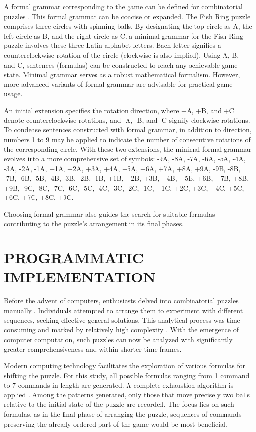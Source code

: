 \documentclass[a4paper,twocolumn,10pt]{article}
\begin{document}
A formal grammar corresponding to the game can be defined for combinatorial puzzles \cite{baral2011solving}. This formal grammar can be concise or expanded. The Fish Ring puzzle comprises three circles with spinning balls. By designating the top circle as A, the left circle as B, and the right circle as C, a minimal grammar \cite{lecomte1999towards} for the Fish Ring puzzle involves these three Latin alphabet letters. Each letter signifies a counterclockwise rotation of the circle (clockwise is also implied). Using A, B, and C, sentences (formulas) can be constructed to reach any achievable game state. Minimal grammar serves as a robust mathematical formalism. However, more advanced variants of formal grammar are advisable for practical game usage.

An initial extension specifies the rotation direction, where +A, +B, and +C denote counterclockwise rotations, and -A, -B, and -C signify clockwise rotations. To condense sentences constructed with formal grammar, in addition to direction, numbers 1 to 9 may be applied to indicate the number of consecutive rotations of the corresponding circle. With these two extensions, the minimal formal grammar evolves into a more comprehensive set of symbols: -9A, -8A, -7A, -6A, -5A, -4A, -3A, -2A, -1A, +1A, +2A, +3A, +4A, +5A, +6A, +7A, +8A, +9A, -9B, -8B, -7B, -6B, -5B, -4B, -3B, -2B, -1B, +1B, +2B, +3B, +4B, +5B, +6B, +7B, +8B, +9B, -9C, -8C, -7C, -6C, -5C, -4C, -3C, -2C, -1C, +1C, +2C, +3C, +4C, +5C, +6C, +7C, +8C, +9C.

Choosing formal grammar also guides the search for suitable formulas contributing to the puzzle's arrangement in its final phases.

\section{PROGRAMMATIC IMPLEMENTATION}

Before the advent of computers, enthusiasts delved into combinatorial puzzles manually \cite{NIPS2016_fc490ca4}. Individuals attempted to arrange them to experiment with different sequences, seeking effective general solutions. This analytical process was time-consuming and marked by relatively high complexity  \cite{Archer2007}. With the emergence of computer computation, such puzzles can now be analyzed with significantly greater comprehensiveness and within shorter time frames.

Modern computing technology facilitates the exploration of various formulas for shifting the puzzle. For this study, all possible formulas ranging from 1 command to 7 commands in length are generated. A complete exhaustion algorithm is applied \cite{Balabanov2024a}. Among the patterns generated, only those that move precisely two balls relative to the initial state of the puzzle are recorded. The focus lies on such formulas, as in the final phase of arranging the puzzle, sequences of commands preserving the already ordered part of the game would be most beneficial.
\end{document}
